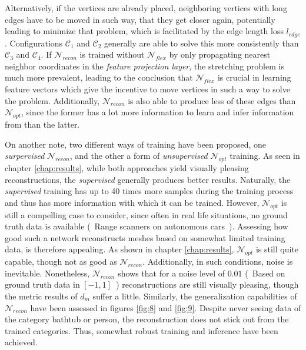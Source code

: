   Alternatively, if the vertices are already placed, neighboring vertices with long edges have to be moved in such way, that they get closer again, 
  potentially leading to minimize that problem, which is facilitated by the edge length loss $l_{edge}$.
  Configurations $\mathcal{C}_1$ and $\mathcal{C}_2$ generally are able to   solve this more consistently than $\mathcal{C}_3$ and $\mathcal{C}_4$. 
  If $\mathcal{N}_{recon}$ is trained without $\mathcal{N}_{flex}$ by only propagating nearest neighbor coordinates in the \emph{feature projection layer},
  the stretching problem is much more prevalent, leading to the conclusion that $\mathcal{N}_{flex}$ is crucial in learning feature vectors which give
  the incentive to move vertices in such a way to solve the problem.
  Additionally, $\mathcal{N}_{recon}$ is also able to produce less of these edges than $\mathcal{N}_{opt}$, since the former has a lot more information
  to learn and infer information from than the latter. 

  On another note, two different ways of training have been proposed, one \emph{surpervised} $\mathcal{N}_{recon}$, and the other a form of
  \emph{unsupervised} $\mathcal{N}_{opt}$ training. 
  As seen in chapter \ref{chap:results}, while both approaches yield visually pleasing reconstructions, the \emph{supervised} generally 
  produces better results. Naturally, the \emph{supervised} training has up to 40 times more samples during the training process and thus 
  has more information with which it can be trained. However, $\mathcal{N}_{opt}$ is still a compelling case to consider, since often in
  real life situations, no ground truth data is available (~Range scanners on autonomous cars~). Assessing how good such a network reconstructs
  meshes based on somewhat limited training data, is therefore appealing. As shown in chapter \ref{chap:results}, $\mathcal{N}_{opt}$ is still
  quite capable, though not as good as $\mathcal{N}_{recon}$. 
  Additionally, in such conditions, noise is inevitable. Nonetheless, $\mathcal{N}_{recon}$ shows that for a noise level of $0.01$ (~Based on ground 
  truth data in $[-1,1]$~) reconstructions are still visually pleasing, though the metric results of $d_m$ suffer a little. 
  Similarly, the generalization capabilities of $\mathcal{N}_{recon}$ have been assessed in figures \ref{fig:8} and \ref{fig:9}. Despite never seeing
  data of the category bathtub or person, the reconstruction does not stick out from the trained categories. Thus, somewhat robust training and inference have been achieved. 

